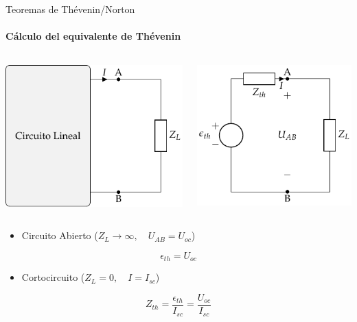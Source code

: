 \documentclass[aspectratio=169, usenames,svgnames,dvipsnames]{beamer}
\begin{document}
\begin{frame}[label={sec:org072df04}]{Teoremas de Thévenin/Norton}
\framesubtitle{Cálculo del equivalente de Thévenin}
\begin{columns}
\begin{column}{0.5\columnwidth}
\begin{center}
\includegraphics[height=0.38\textheight]{../figs/CircuitoLineal_ZL.pdf}
\end{center}
\end{column}

\begin{column}{0.5\columnwidth}
\begin{center}
\includegraphics[height=0.38\textheight]{../figs/EquivalenteThevenin.pdf}
\end{center}
\end{column}
\end{columns}


\begin{itemize}
\item Circuito Abierto (\(Z_L \to \infty, \quad U_{AB} = U_{oc}\))
\end{itemize}
\[
\boxed{\epsilon_{th} = U_{oc}}
\]
\begin{itemize}
\item Cortocircuito (\(Z_L = 0, \quad I = I_{sc}\))
\end{itemize}
\[
\boxed{Z_{th} = \frac{\epsilon_{th}}{I_{sc}} = \frac{U_{oc}}{I_{sc}}}
\]
\end{frame}
\end{document}
